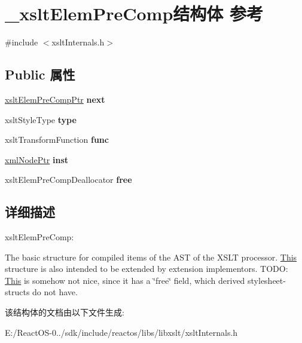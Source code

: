 \hypertarget{struct__xslt_elem_pre_comp}{}\section{\+\_\+xslt\+Elem\+Pre\+Comp结构体 参考}
\label{struct__xslt_elem_pre_comp}


{\ttfamily \#include $<$xslt\+Internals.\+h$>$}

\subsection*{Public 属性}
\begin{DoxyCompactItemize}
\item 
\mbox{\label{struct__xslt_elem_pre_comp_a0b87d31043960e0975afb2cbe708400f}} 
\hyperlink{struct__xslt_elem_pre_comp}{xslt\+Elem\+Pre\+Comp\+Ptr} {\bfseries next}
\item 
\mbox{\label{struct__xslt_elem_pre_comp_a722aac07f32fc092e21577f9d808cfb0}} 
xslt\+Style\+Type {\bfseries type}
\item 
\mbox{\label{struct__xslt_elem_pre_comp_ab6b1602b503b5b0415fcf6036ec3b347}} 
xslt\+Transform\+Function {\bfseries func}
\item 
\mbox{\label{struct__xslt_elem_pre_comp_acb617a5e1706482bfd24c5253417626f}} 
\hyperlink{struct__xml_node}{xml\+Node\+Ptr} {\bfseries inst}
\item 
\mbox{\label{struct__xslt_elem_pre_comp_a04141bfdfc01d832823774e5bc8b3952}} 
xslt\+Elem\+Pre\+Comp\+Deallocator {\bfseries free}
\end{DoxyCompactItemize}


\subsection{详细描述}
xslt\+Elem\+Pre\+Comp\+:

The basic structure for compiled items of the A\+ST of the X\+S\+LT processor. \hyperlink{namespace_this}{This} structure is also intended to be extended by extension implementors. T\+O\+DO\+: \hyperlink{namespace_this}{This} is somehow not nice, since it has a \char`\"{}free\char`\"{} field, which derived stylesheet-\/structs do not have. 

该结构体的文档由以下文件生成\+:\begin{DoxyCompactItemize}
\item 
E\+:/\+React\+O\+S-\/0../sdk/include/reactos/libs/libxslt/xslt\+Internals.\+h\end{DoxyCompactItemize}

